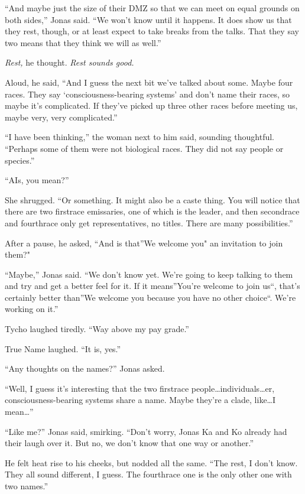 ``And maybe just the size of their DMZ so that we can meet on equal grounds on both sides,'' Jonas said. ``We won't know until it happens. It does show us that they rest, though, or at least expect to take breaks from the talks. That they say two means that they think we will as well.''

\emph{Rest,} he thought. \emph{Rest sounds good.}

Aloud, he said, ``And I guess the next bit we've talked about some. Maybe four races. They say `consciousness-bearing systems' and don't name their races, so maybe it's complicated. If they've picked up three other races before meeting us, maybe very, very complicated.''

``I have been thinking,'' the woman next to him said, sounding thoughtful. ``Perhaps some of them were not biological races. They did not say people or species.''

``AIs, you mean?''

She shrugged. ``Or something. It might also be a caste thing. You will notice that there are two firstrace emissaries, one of which is the leader, and then secondrace and fourthrace only get representatives, no titles. There are many possibilities.''

After a pause, he asked, ``And is that''We welcome you" an invitation to join them?"

``Maybe,'' Jonas said. ``We don't know yet. We're going to keep talking to them and try and get a better feel for it. If it means''You're welcome to join us``, that's certainly better than''We welcome you because you have no other choice``. We're working on it.''

Tycho laughed tiredly. ``Way above my pay grade.''

True Name laughed. ``It is, yes.''

``Any thoughts on the names?'' Jonas asked.

``Well, I guess it's interesting that the two firstrace people\ldots individuals\ldots er, consciousness-bearing systems share a name. Maybe they're a clade, like\ldots I mean\ldots{}''

``Like me?'' Jonas said, smirking. ``Don't worry, Jonas Ka and Ko already had their laugh over it. But no, we don't know that one way or another.''

He felt heat rise to his cheeks, but nodded all the same. ``The rest, I don't know. They all sound different, I guess. The fourthrace one is the only other one with two names.''

